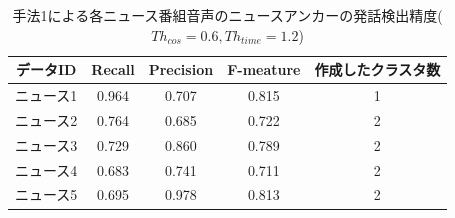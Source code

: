 \begin{table}[H]
  \begin{center}
    \caption{手法1による各ニュース番組音声のニュースアンカーの発話検出精度($Th_{cos}=0.6,Th_{time}=1.2$) }
    \begin{tabular}{|c||c|c|c|c|} \hline
データID & Recall & Precision & F-meature & 作成したクラスタ数\\ \hline
ニュース1 & 0.964 & 0.707 & 0.815 & 1 \\ \hline
ニュース2 & 0.764 & 0.685 & 0.722 & 2 \\ \hline
ニュース3 & 0.729 & 0.860 & 0.789 & 2 \\ \hline
ニュース4 & 0.683 & 0.741 & 0.711 & 2 \\ \hline
ニュース5 & 0.695 & 0.978 & 0.813 & 2 \\ \hline
    \end{tabular}
  \end{center}
\end{table}

